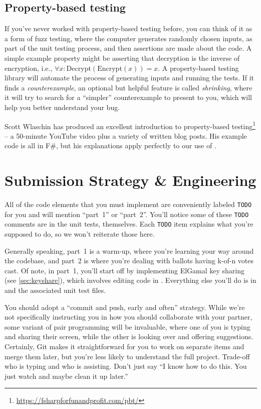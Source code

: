 \subsection{Property-based testing}
\label{sec:properties}
If you've never worked with property-based testing before, you can
think of it as a form of fuzz testing, where the computer generates
randomly chosen inputs, as part of the unit testing process, and then
assertions are made about the code. A simple example property might be
asserting that decryption is the inverse of encryption, i.e.,
$\forall x: \mathrm{Decrypt}(\mathrm{Encrypt}(x)) = x$. A
property-based testing library will automate the process of generating
inputs and running the tests. If it finds a {\em counterexample}, an
optional but helpful feature is called {\em shrinking}, where it will
try to search for a ``simpler'' counterexample to present to you,
which will help you better understand your bug. 

Scott Wlaschin has produced an excellent introduction to property-based
testing\footnote{\url{https://fsharpforfunandprofit.com/pbt/}} -- a
50-minute YouTube video plus a variety of written blog posts. His
example code is all in F\#, but his explanations apply
perfectly to our use of .

\section{Submission Strategy \& Engineering}

All of the code elements that you must implement are conveniently
labeled {\tt TODO} for you and will mention ``part~1'' or ``part~2''.
You'll notice some of these {\tt TODO} comments are in the unit tests,
themselves. Each {\tt TODO} item explains what you're supposed to do,
so we won't reiterate those here.

Generally speaking, part~1 is a warm-up, where you're learning your
way around the codebase, and part~2 is where you're dealing with
ballots having k-of-n votes cast. Of note, in part~1, you'll start
off by implementing ElGamal key sharing (see \ref{sec:keyshare}),
which involves editing code in .
Everything else you'll do is in
and the associated unit test files.

You should adopt a ``commit and push, early and often'' strategy.
While we're not specifically instructing you in how you should
collaborate with your partner, some variant of pair programming will
be invaluable, where one of you is typing and sharing their screen,
while the other is looking over and offering suggestions. Certainly,
Git makes it straightforward for you to work on separate items and
merge them later, but you're less likely to understand the full
project. Trade-off who is typing and who is assisting. Don't just say
``I know how to do this. You just watch and maybe clean it up later.''

